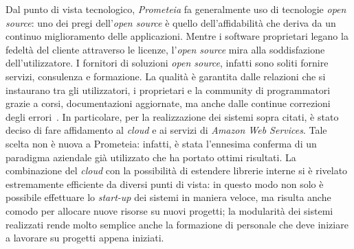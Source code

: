 Dal punto di vista tecnologico, \textit{Prometeia} fa generalmente uso di tecnologie \textit{open source}:
uno dei pregi dell'\textit{open source} è quello dell'affidabilità che deriva da un continuo miglioramento delle applicazioni.
Mentre i software proprietari legano la fedeltà del cliente attraverso le licenze, l'\textit{open source} mira alla soddisfazione dell’utilizzatore.
I fornitori di soluzioni \textit{open source}, infatti sono soliti fornire servizi, consulenza e formazione.
La qualità è garantita dalle relazioni che si instaurano tra gli utilizzatori, i proprietari e la community di programmatori grazie a corsi, documentazioni aggiornate, ma anche dalle continue correzioni degli errori~\cite{open-source}.
In particolare, per la realizzazione dei sistemi sopra citati, è stato deciso di fare affidamento al \textit{cloud} e ai servizi di \textit{Amazon Web Services}.
Tale scelta non è nuova a Prometeia:
infatti, è stata l'ennesima conferma di un paradigma aziendale già utilizzato che ha portato ottimi risultati.
La combinazione del \textit{cloud} con la possibilità di estendere librerie interne si è rivelato estremamente efficiente da diversi punti di vista:
in questo modo non solo è possibile effettuare lo \textit{start-up} dei sistemi in maniera veloce, ma risulta anche comodo per allocare nuove risorse su nuovi progetti;
la modularità dei sistemi realizzati rende molto semplice anche la formazione di personale che deve iniziare a lavorare su progetti appena iniziati.
